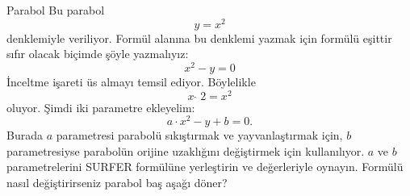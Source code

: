 \begin{surferPage}[Parabol]{Parabol}
Bu parabol \[y=x^2\] denklemiyle veriliyor.
Formül alanına bu denklemi yazmak için formülü eşittir sıfır olacak biçimde şöyle yazmalıyız:
\[x^2-y=0\]
İnceltme işareti üs almayı temsil ediyor. Böylelikle 
\[ x  \,\hat{\ } \, 2 =x^2\] oluyor.
Şimdi iki  parametre ekleyelim:
\[a \cdot x^2-y+b=0.\]
Burada $a$ parametresi parabolü sıkıştırmak ve yayvanlaştırmak için, $b$ parametresiyse
parabolün orijine uzaklığını değiştirmek için kullanılıyor.
\newline
$a$ ve $b$ parametrelerini SURFER formülüne yerleştirin ve değerleriyle oynayın. Formülü nasıl değiştirirseniz parabol baş aşağı döner?
\end{surferPage}
